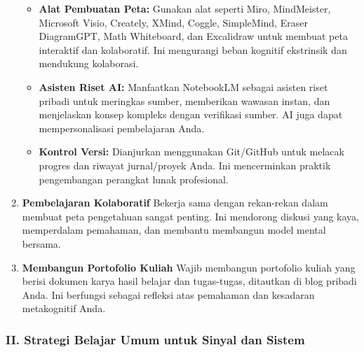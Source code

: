 \documentclass[
  letterpaper,
  DIV=11,
  numbers=noendperiod]{scrreprt}
\providecommand{\tightlist}{%
  \setlength{\itemsep}{0pt}\setlength{\parskip}{0pt}}
\begin{document}
\begin{enumerate}
  \begin{itemize}
  \tightlist
  \item
    \textbf{Alat Pembuatan Peta:} Gunakan alat seperti Miro,
    MindMeister, Microsoft Visio, Creately, XMind, Coggle, SimpleMind,
    Eraser DiagramGPT, Math Whiteboard, dan Excalidraw untuk membuat
    peta interaktif dan kolaboratif. Ini mengurangi beban kognitif
    ekstrinsik dan mendukung kolaborasi.
  \item
    \textbf{Asisten Riset AI:} Manfaatkan NotebookLM sebagai asisten
    riset pribadi untuk meringkas sumber, memberikan wawasan instan, dan
    menjelaskan konsep kompleks dengan verifikasi sumber. AI juga dapat
    mempersonalisasi pembelajaran Anda.
  \item
    \textbf{Kontrol Versi:} Dianjurkan menggunakan Git/GitHub untuk
    melacak progres dan riwayat jurnal/proyek Anda. Ini mencerminkan
    praktik pengembangan perangkat lunak profesional.
  \end{itemize}
\item
  \textbf{Pembelajaran Kolaboratif} Bekerja sama dengan rekan-rekan
  dalam membuat peta pengetahuan sangat penting. Ini mendorong diskusi
  yang kaya, memperdalam pemahaman, dan membantu membangun model mental
  bersama.
\item
  \textbf{Membangun Portofolio Kuliah} Wajib membangun portofolio kuliah
  yang berisi dokumen karya hasil belajar dan tugas-tugas, ditautkan di
  blog pribadi Anda. Ini berfungsi sebagai refleksi atas pemahaman dan
  kesadaran metakognitif Anda.
\end{enumerate}

\subsubsection*{\texorpdfstring{\textbf{II. Strategi Belajar Umum untuk
Sinyal dan
Sistem}}{II. Strategi Belajar Umum untuk Sinyal dan Sistem}}\label{ii.-strategi-belajar-umum-untuk-sinyal-dan-sistem}
\end{document}
